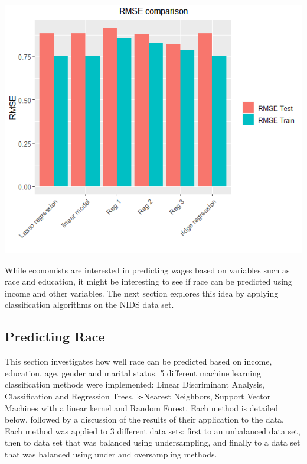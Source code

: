 \documentclass[11pt,preprint, authoryear]{elsarticle}
\let\origfigure\figure
\let\endorigfigure\endfigure
\renewenvironment{figure}[1][2] {
    \expandafter\origfigure\expandafter[H]
} {
    \endorigfigure
}
\numberwithin{equation}{section}
\numberwithin{figure}{section}
\numberwithin{table}{section}
\begin{document}
\begin{figure}
\centering
\includegraphics{"images/RMSE.png"}
\caption{RMSE comparison}
\end{figure}

While economists are interested in predicting wages based on variables
such as race and education, it might be interesting to see if race can
be predicted using income and other variables. The next section explores
this idea by applying classification algorithms on the NIDS data set.

\hypertarget{predicting-race}{%
\subsection{\texorpdfstring{Predicting Race
\label{race}}{Predicting Race }}\label{predicting-race}}

This section investigates how well race can be predicted based on
income, education, age, gender and marital status. 5 different machine
learning classification methods were implemented: Linear Discriminant
Analysis, Classification and Regression Trees, k-Nearest Neighbors,
Support Vector Machines with a linear kernel and Random Forest. Each
method is detailed below, followed by a discussion of the results of
their application to the data. Each method was applied to 3 different
data sets: first to an unbalanced data set, then to data set that was
balanced using undersampling, and finally to a data set that was
balanced using under and oversampling methods.
\end{document}

